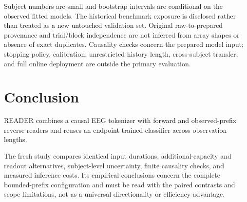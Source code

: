 \documentclass[conference]{IEEEtran}
\begin{document}
Subject numbers are small and bootstrap intervals are conditional on the
observed fitted models. The historical benchmark exposure is disclosed rather
than treated as a new untouched validation set. Original raw-to-prepared
provenance and trial/block independence are not inferred from array shapes
or absence of exact duplicates. Causality checks concern the prepared model
input; stopping policy, calibration, unrestricted history length, cross-subject
transfer, and full online deployment are outside the primary evaluation.

\section{Conclusion}
READER combines a causal EEG tokenizer with forward and observed-prefix reverse
readers and reuses an endpoint-trained classifier across observation lengths.

The fresh study compares identical input durations, additional-capacity and
readout alternatives, subject-level uncertainty, finite causality checks,
and measured inference costs. Its empirical conclusions concern the complete
bounded-prefix configuration and must be read with the paired contrasts and
scope limitations, not as a universal directionality or efficiency advantage.



\end{document}

